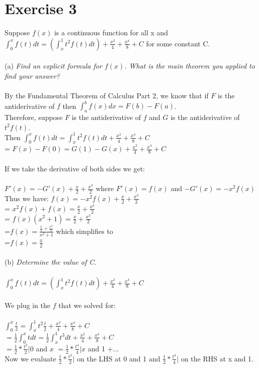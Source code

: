 \documentclass[12pt]{article}
\begin{document}
\section{Exercise 3}
Suppose $f(x)$ is a continuous function for all x and $\int_{0}^{x}f(t)dt = (\int_{x}^{1}t^2f(t)dt) + \frac{x^2}{4}+\frac{x^4}{8}+C$ for some constant C. \\~\\
(a) \textit{Find an explicit formula for $f(x)$. What is the main theorem you applied to find your answer?}\\~\\
By the Fundamental Theorem of Calculus Part 2, we know that if $F$ is the antiderivative of $f$ then $\int_{a}^{b}f(x)dx = F(b) - F(a)$. \\
Therefore, suppose $F$ is the antiderivative of $f$ and $G$ is the antiderivative of $t^2f(t)$. \\
Then $\int_{0}^{x}f(t)dt = \int_{x}^{1}t^2f(t)dt + \frac{x^2}{4} + \frac{x^4}{8}+C$\\
= $F(x) - F(0) = G(1) - G(x) + \frac{x^2}{4} + \frac{x^4}{8}+C$ \\~\\
If we take the derivative of both sides we get:\\~\\
$F'(x) = -G'(x) + \frac{x}{2} + \frac{x^3}{2}$ where $F'(x) = f(x)$ and $-G'(x) = -x^2f(x)$\\
Thus we have: $f(x) = -x^2f(x) + \frac{x}{2} + \frac{x^3}{2}$\\
= $x^2f(x) + f(x) = \frac{x}{2} + \frac{x^3}{2}$\\
= $f(x)(x^2+1) = \frac{x}{2} + \frac{x^3}{2}$\\
=$f(x) = \frac{\frac{x}{2} + \frac{x^3}{2}}{x^2+1}$ which simplifies to\\
=$f(x) = \frac{x}{2}$\\~\\
(b) \textit{Determine the value of C}.\\~\\
$\int_{0}^{x}f(t)dt = (\int_{x}^{1}t^2f(t)dt) + \frac{x^2}{4}+\frac{x^4}{8}+C$\\~\\
We plug in the $f$ that we solved for:\\~\\
$\int_{0}^{x}\frac{t}{2} = \int_{x}^{1}t^2\frac{t}{2} + \frac{x^2}{4}+\frac{x^4}{8}+C$\\
$ = \frac{1}{2}\int_0^x tdt = \frac{1}{2} \int_x^1 t^3dt + \frac{x^2}{4}+\frac{x^4}{8}+C$ \\
$ = \frac{1}{2} * \frac{t^2}{2} \bigg| 0$ and $x$ $= \frac{1}{2} * \frac{t^4}{4} \bigg| x$ and 1 $+ ...$\\
Now we evaluate $\frac{1}{2} * \frac{t^2}{2}\bigg|$ on the LHS at 0 and 1 and $\frac{1}{2} *  \frac{t^4}{4}\bigg|$ on the RHS at x and 1.\\~\\
\end{document}
